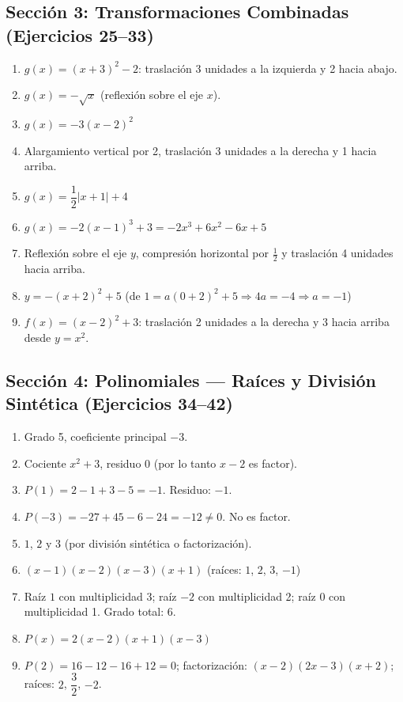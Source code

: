 \documentclass[12pt, letterpaper]{article}
\begin{document}
\newpage


\subsection*{Sección 3: Transformaciones Combinadas (Ejercicios 25--33)}
\begin{enumerate}[resume=respuestas, leftmargin=*, label=\textbf{\arabic*.}]
  \item $g(x) = (x + 3)^2 - 2$: traslación 3 unidades a la izquierda y 2 hacia abajo.
  \item $g(x) = -\sqrt{x}$ (reflexión sobre el eje $x$).
  \item $g(x) = -3(x - 2)^2$
  \item Alargamiento vertical por 2, traslación 3 unidades a la derecha y 1 hacia arriba.
  \item $g(x) = \dfrac{1}{2}|x + 1| + 4$
  \item $g(x) = -2(x - 1)^3 + 3 = -2x^3 + 6x^2 - 6x + 5$
  \item Reflexión sobre el eje $y$, compresión horizontal por $\frac{1}{2}$ y traslación 4 unidades hacia arriba.
  \item $y = -(x + 2)^2 + 5$ \quad (de $1 = a(0 + 2)^2 + 5 \Rightarrow 4a = -4 \Rightarrow a = -1$)
  \item $f(x) = (x - 2)^2 + 3$: traslación 2 unidades a la derecha y 3 hacia arriba desde $y = x^2$.
\end{enumerate}

\subsection*{Sección 4: Polinomiales — Raíces y División Sintética (Ejercicios 34--42)}
\begin{enumerate}[resume=respuestas, leftmargin=*, label=\textbf{\arabic*.}]
  \item Grado 5, coeficiente principal $-3$.
  \item Cociente $x^2 + 3$, residuo $0$ (por lo tanto $x - 2$ es factor).
  \item $P(1) = 2 - 1 + 3 - 5 = -1$. Residuo: $-1$.
  \item $P(-3) = -27 + 45 - 6 - 24 = -12 \neq 0$. No es factor.
  \item $1$, $2$ y $3$ (por división sintética o factorización).
  \item $(x - 1)(x - 2)(x - 3)(x + 1)$ \quad (raíces: $1$, $2$, $3$, $-1$)
  \item Raíz $1$ con multiplicidad 3; raíz $-2$ con multiplicidad 2; raíz $0$ con multiplicidad 1. Grado total: 6.
  \item $P(x) = 2(x - 2)(x + 1)(x - 3)$
  \item $P(2) = 16 - 12 - 16 + 12 = 0$; \quad factorización: $(x - 2)(2x - 3)(x + 2)$; \quad raíces: $2$, $\dfrac{3}{2}$, $-2$.
\end{enumerate}
\end{document}
